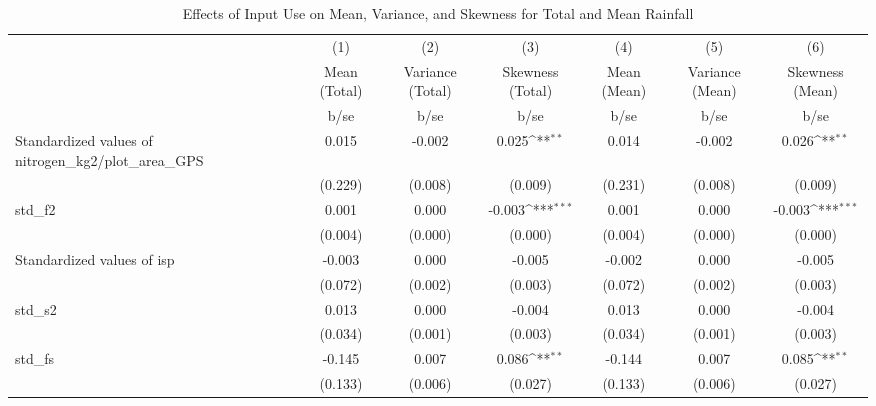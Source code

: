 \begin{table}[htbp]\centering
\def\sym#1{\ifmmode^{#1}\else\(^{#1}\)\fi}
\caption{Effects of Input Use on Mean, Variance, and Skewness for Total and Mean Rainfall}
\begin{tabular}{l*{6}{c}}
\toprule
                &\multicolumn{1}{c}{(1)}&\multicolumn{1}{c}{(2)}&\multicolumn{1}{c}{(3)}&\multicolumn{1}{c}{(4)}&\multicolumn{1}{c}{(5)}&\multicolumn{1}{c}{(6)}\\
                &\multicolumn{1}{c}{Mean (Total)}&\multicolumn{1}{c}{Variance (Total)}&\multicolumn{1}{c}{Skewness (Total)}&\multicolumn{1}{c}{Mean (Mean)}&\multicolumn{1}{c}{Variance (Mean)}&\multicolumn{1}{c}{Skewness (Mean)}\\
                &     b/se         &     b/se         &     b/se         &     b/se         &     b/se         &     b/se         \\
\midrule
Standardized values of nitrogen\_kg2/plot\_area\_GPS&    0.015         &   -0.002         &    0.025\sym{**} &    0.014         &   -0.002         &    0.026\sym{**} \\
                &  (0.229)         &  (0.008)         &  (0.009)         &  (0.231)         &  (0.008)         &  (0.009)         \\
std\_f2          &    0.001         &    0.000         &   -0.003\sym{***}&    0.001         &    0.000         &   -0.003\sym{***}\\
                &  (0.004)         &  (0.000)         &  (0.000)         &  (0.004)         &  (0.000)         &  (0.000)         \\
Standardized values of isp&   -0.003         &    0.000         &   -0.005         &   -0.002         &    0.000         &   -0.005         \\
                &  (0.072)         &  (0.002)         &  (0.003)         &  (0.072)         &  (0.002)         &  (0.003)         \\
std\_s2          &    0.013         &    0.000         &   -0.004         &    0.013         &    0.000         &   -0.004         \\
                &  (0.034)         &  (0.001)         &  (0.003)         &  (0.034)         &  (0.001)         &  (0.003)         \\
std\_fs          &   -0.145         &    0.007         &    0.086\sym{**} &   -0.144         &    0.007         &    0.085\sym{**} \\
                &  (0.133)         &  (0.006)         &  (0.027)         &  (0.133)         &  (0.006)         &  (0.027)         \\

\end{tabular}
\end{table}
